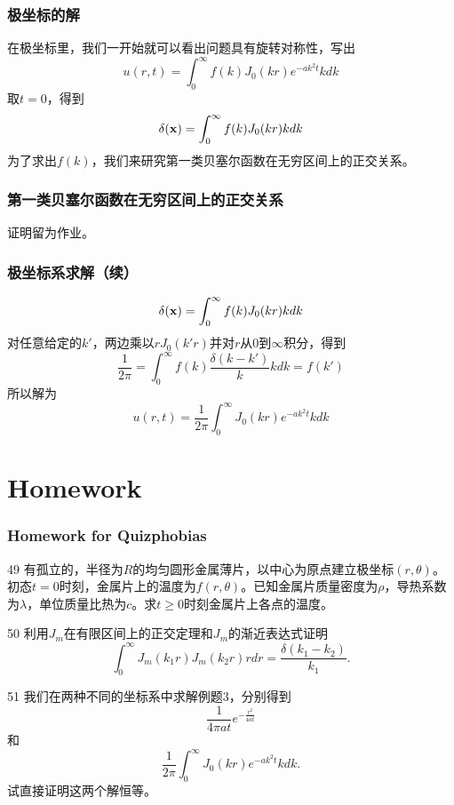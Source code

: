\documentclass[CJK]{beamer}
\begin{document}
\begin{frame}
  \frametitle{极坐标的解}
  
  在极坐标里，我们一开始就可以看出问题具有旋转对称性，写出
  $$  u(r, t) = \int_0^\infty f(k) J_0(kr)e^{-ak^2t} k dk $$
  取$t=0$，得到
  $$  \delta({\mathbf{x}}) = \int_0^\infty f(k) J_0(kr) k dk $$  
  为了求出$f(k)$，我们来研究第一类贝塞尔函数在无穷区间上的正交关系。
  
\end{frame}


\begin{frame}
  \frametitle{第一类贝塞尔函数在无穷区间上的正交关系}
  
  证明留为作业。
  
\end{frame}


\begin{frame}
  \frametitle{极坐标系求解（续）}
  
  $$  \delta({\mathbf{x}}) = \int_0^\infty f(k) J_0(kr)k dk $$
  对任意给定的$k'$，两边乘以$rJ_0(k'r)$并对$r$从$0$到$\infty$积分，得到
  $$ \frac{1}{2\pi} = \int_0^\infty f(k)\frac{\delta(k-k')}{k} k dk =f(k')$$
  所以解为
  $$  u(r, t) = \frac{1}{2\pi} \int_0^\infty J_0(kr)e^{-ak^2t} k dk $$  
  
\end{frame}



\section{Homework}

\begin{frame}
  \frametitle{Homework for Quizphobias}
  
  \bitem
\item[49]{  有孤立的，半径为$R$的均匀圆形金属薄片，以中心为原点建立极坐标$(r,\theta)$。初态$t=0$时刻，金属片上的温度为$f(r,\theta)$。已知金属片质量密度为$\rho$，导热系数为$\lambda$，单位质量比热为$c$。求$t\ge 0$时刻金属片上各点的温度。}
\item[50]{利用$J_m$在有限区间上的正交定理和$J_m$的渐近表达式证明
  $$ \int_0^\infty J_m(k_1r)J_m(k_2r) r dr = \frac{\delta(k_1-k_2)}{k_1}. $$ }
\item[51]{  
  我们在两种不同的坐标系中求解例题3，分别得到
  $$\frac{1}{4\pi at}e^{-\frac{r^2}{4at}}$$
  和
  $$ \frac{1}{2\pi} \int_0^\infty J_0(kr)e^{-ak^2t} k dk.$$
  试直接证明这两个解恒等。}
  \eitem
  
\end{frame}

\ech
\end{document}
